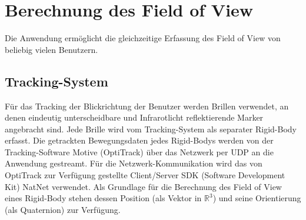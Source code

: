 \documentclass[]{article}
\newcommand{\FOV}{Field of View}
\begin{document}


\section{Berechnung des \FOV{}}

Die Anwendung ermöglicht die gleichzeitige Erfassung des \FOV{} von beliebig vielen Benutzern.

\subsection{Tracking-System}

Für das Tracking der Blickrichtung der Benutzer werden Brillen verwendet, an denen eindeutig unterscheidbare und Infrarotlicht reflektierende Marker angebracht sind.
Jede Brille wird vom Tracking-System als separater Rigid-Body erfasst.
Die getrackten Bewegungsdaten jedes Rigid-Bodys werden von der Tracking-Software Motive (OptiTrack) über das Netzwerk per UDP an die Anwendung gestreamt.
Für die Netzwerk-Kommunikation wird das von OptiTrack zur Verfügung gestellte Client/Server SDK (Software Development Kit) \glqq{}NatNet\grqq{} verwendet.
Als Grundlage für die Berechnung des \FOV{} eines Rigid-Body stehen dessen Position (als Vektor in $\mathbb{R}^{3}$) und seine Orientierung (als Quaternion) zur Verfügung.


\end{document}

